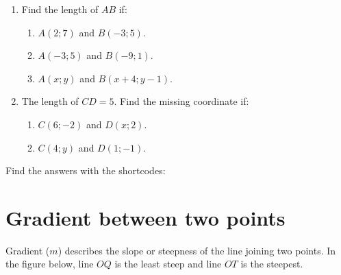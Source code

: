 \begin{exercises}{}{
\begin{enumerate}[label=\textbf{\arabic*}.]
\item Find the length of $AB$ if:
 \begin{enumerate}[noitemsep, label=\textbf{(\alph*)} ] 
\item $A(2;7)$ and $B(-3;5)$.
\item $A(-3;5)$ and $B(-9;1)$.
\item $A(x;y)$ and $B(x+4;y-1)$.
\end{enumerate}

\item The length of $CD=5$. Find the missing coordinate if:
 \begin{enumerate}[noitemsep, label=\textbf{(\alph*)} ] 
\item $C(6;-2)$ and $D(x;2)$.
\item $C(4;y)$ and $D(1;-1)$.
\end{enumerate}
\end{enumerate}

Find the answers with the shortcodes:}
\end{exercises}

%     
%     
%     

\section{Gradient between two points}
Gradient ($m$) describes the slope or steepness of the line joining two points. In the figure below, line $OQ$ is the least steep and line $OT$ is the steepest.

